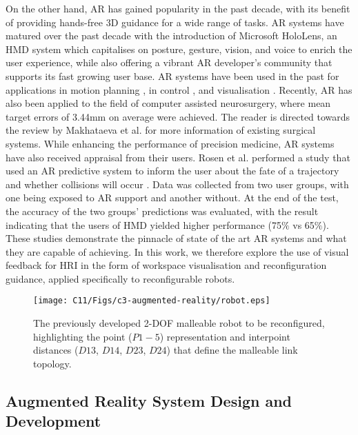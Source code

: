 On the other hand, AR has gained popularity in the past decade, with its benefit of providing hands-free 3D guidance for a wide range of tasks. AR systems have matured over the past decade with the introduction of Microsoft HoloLens, an HMD system which capitalises on posture, gesture, vision, and voice to enrich the user experience, while also offering a vibrant AR developer's community that supports its fast growing user base. AR systems have been used in the past for applications in motion planning \cite{rosen2019communicating}, in control \cite{ostanin2019interactive}, and visualisation \cite{frank2017mobile}. Recently, AR has also been applied to the field of computer assisted neurosurgery, where mean target errors of 3.44mm on average \cite{kersten2015augmented} were achieved. The reader is directed towards the review by Makhataeva et al. \cite{makhataeva2020augmented} for more information of existing surgical systems. While enhancing the performance of precision medicine, AR systems have also received appraisal from their users. Rosen et al. performed a study that used an AR predictive system to inform the user about the fate of a trajectory and whether collisions will occur \cite{rosen2019communicating}. Data was collected from two user groups, with one being exposed to AR support and another without. At the end of the test, the accuracy of the two groups' predictions was evaluated, with the result indicating that the users of HMD yielded higher performance (75$\%$ vs 65$\%$). These studies demonstrate the pinnacle of state of the art AR systems and what they are capable of achieving.
In this work, we therefore explore the use of visual feedback for HRI in the form of workspace visualisation and reconfiguration guidance, applied specifically to reconfigurable robots.


\begin{figure}[t!]
    \centering
    \texttt{[image: C11/Figs/c3-augmented-reality/robot.eps]}
    \caption{The previously developed 2-DOF malleable robot to be reconfigured, highlighting the point ($P1-5$) representation and interpoint distances ($D13$, $D14$, $D23$, $D24$) that define the malleable link topology.}
    \label{malleablerobot}
\end{figure}



\subsection{Augmented Reality System Design and Development}

